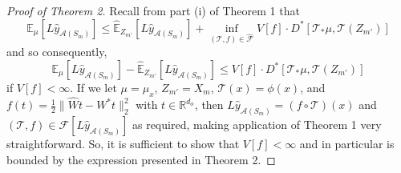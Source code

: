 \documentclass{article}
\begin{document}
\begin{proof}[Proof of Theorem 2]
    Recall from part (i) of Theorem 1 that
    \[\mathbb{E}_{\mu} \left[L \hat{y}_{\mathcal{A}(S_m)} \right] \leq \hat{\mathbb{E}}_{Z_{m'}} \left[L \hat{y}_{\mathcal{A}(S_m)} \right]  + \inf_{(\mathcal{T}, f) \in \hat{\mathcal{F}}} V[f] \cdot D^* [\mathcal{T}_{*} \mu, \mathcal{T}(Z_{m'})]\]
    and so consequently,
    \[\mathbb{E}_{\mu} \left[L \hat{y}_{\mathcal{A}(S_m)} \right] - \hat{\mathbb{E}}_{Z_{m'}} \left[L \hat{y}_{\mathcal{A}(S_m)} \right] \leq V[f] \cdot D^* [\mathcal{T}_{*} \mu, \mathcal{T}(Z_{m'})]\]
    if $V[f] < \infty$. If we let $\mu = \mu_x$, $Z_{m'} = X_m$, $\mathcal{T}(x) = \phi(x)$, and $f(t) = \frac{1}{2} \lVert \hat{W}t - W^* t \rVert_2^2$ with $t \in \mathbb{R}^{d_\phi}$, then $L \hat{y}_{\mathcal{A}(S_m)} = (f \circ \mathcal{T})(x)$ and $(\mathcal{T}, f) \in \mathcal{F}[L \hat{y}_{\mathcal{A}(S_m)}]$ as required, making application of Theorem 1 very straightforward. So, it is sufficient to show that $V[f] < \infty$ and in particular is bounded by the expression presented in Theorem 2.


\end{proof}
\end{document}
